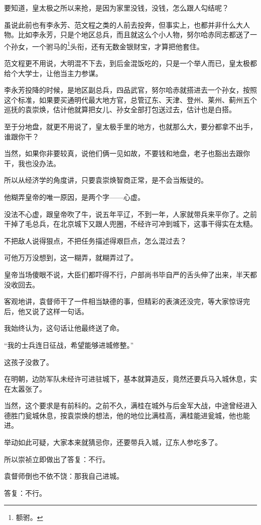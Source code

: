 \begin{multicols}{\theparacolNo}
要知道，皇太极之所以来抢，是因为家里没钱，没钱，怎么跟人勾结呢？

虽说此前也有李永芳、范文程之类的人前去投奔，但事实上，也都并非什么大人物。比如李永芳，只是个地区总兵，而且就这么个小人物，努尔哈赤同志都送了一个孙女，一个驸马的\footnote{额驸。}头衔，还有无数金银财宝，才算把他套住。

范文程更不用说，大明混不下去，到后金混饭吃的，只是一个举人而已，皇太极都给个大学士，让他当主力参谋。

李永芳投降的时候，是地区副总兵，四品武官，努尔哈赤就搭进去一个孙女，按照这个标准，如果要买通明代最大地方官，总管辽东、天津、登州、莱州、蓟州五个巡抚的袁崇焕，估计他就算把女儿、孙女全部打包送过去，估计也是白搭。

至于分地盘，就更不用说了，皇太极手里的地方，也就那么大，要分都拿不出手，谁跟你干？

当然，如果你非要较真，说他们俩一见如故，不要钱和地盘，老子也豁出去跟你干，我也没办法。

所以从经济学的角度讲，只要袁崇焕智商正常，是不会当叛徒的。

他糊弄皇帝的唯一原因，是两个字——心虚。

没法不心虚，跟皇帝吹了牛，说五年平辽，不到一年，人家就带兵来平你了。之前干掉了毛总兵，在北京城下又跟人兜圈，不经许可冲到城下，这事干得实在太糙。

不把敌人说得狠点，不把任务描述得艰巨点，怎么混过去？

可他万万没想到，这一糊弄，就糊弄过了。

皇帝当场傻眼不说，大臣们都吓得不行，户部尚书毕自严的舌头伸了出来，半天都没收回去。

客观地讲，袁督师干了一件相当缺德的事，但精彩的表演还没完，等大家惊讶完后，他又说了这样一句话。

我始终认为，这句话让他最终送了命。

“我的士兵连日征战，希望能够进城修整。”

这孩子没救了。

在明朝，边防军队未经许可进驻城下，基本就算造反，竟然还要兵马入城休息，实在太嚣张了。

当然，这个要求是有前科的。之前不久，满桂在城外与后金军大战，中途曾经进入德胜门瓮城休息，按袁崇焕的想法，他的地位比满桂高，满桂能进瓮城，他也能进。

举动如此可疑，大家本来就猜忌你，还要带兵入城，辽东人参吃多了。

所以崇祯立即做出了答复：不行。

袁督师倒也不依不饶：那我自己进城。

答复：不行。


\end{multicols}
